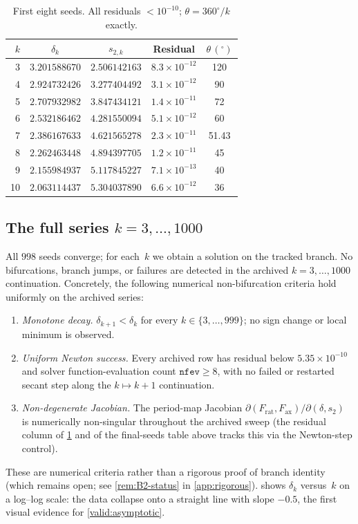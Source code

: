 \documentclass[11pt,a4paper]{article}
\theoremstyle{plain}
\theoremstyle{definition}
\theoremstyle{remark}
\begin{document}
\begin{table}[ht]
\centering
\caption{First eight seeds.  All residuals
  $< 10^{-10}$; $\theta = 360^\circ/k$ exactly.}
\label{tab:first-seeds}
\smallskip
\begin{tabular}{@{}rcccc@{}}
\toprule
$k$ & $\delta_k$ & $s_{2,k}$ & Residual & $\theta\,(^\circ)$ \\
\midrule
3  & $3.201588670$ & $2.506142163$ & $8.3 \times 10^{-12}$ & 120 \\
4  & $2.924732426$ & $3.277404492$ & $3.1 \times 10^{-12}$ & 90 \\
5  & $2.707932982$ & $3.847434121$ & $1.4 \times 10^{-11}$ & 72 \\
6  & $2.532186462$ & $4.281550094$ & $5.1 \times 10^{-12}$ & 60 \\
7  & $2.386167633$ & $4.621565278$ & $2.3 \times 10^{-11}$ & 51.43 \\
8  & $2.262463448$ & $4.894397705$ & $1.2 \times 10^{-11}$ & 45 \\
9  & $2.155984937$ & $5.117845227$ & $7.1 \times 10^{-13}$ & 40 \\
10 & $2.063114437$ & $5.304037890$ & $6.6 \times 10^{-12}$ & 36 \\
\bottomrule
\end{tabular}
\end{table}

\subsection{The full series \texorpdfstring{$k = 3,\ldots,1000$}{k = 3,...,1000}}
\label{sec:full-series}
All $998$ seeds converge; for each~$k$ we obtain a
solution on the tracked branch.
No bifurcations, branch jumps, or
failures are detected in the archived $k = 3,\ldots,1000$
continuation.  Concretely, the following numerical non-bifurcation
criteria hold uniformly on the archived series:
\begin{enumerate}[label=\upshape(\roman*),nosep]
\item \emph{Monotone decay.}  $\delta_{k+1} < \delta_k$ for every
  $k\in\{3,\ldots,999\}$; no sign change or local minimum is observed.
\item \emph{Uniform Newton success.}  Every archived row has residual
  below $5.35\times 10^{-10}$ and solver function-evaluation count
  $\texttt{nfev}\ge 8$, with no failed or restarted secant step along
  the $k\mapsto k+1$ continuation.
\item \emph{Non-degenerate Jacobian.}  The period-map Jacobian
  $\partial(F_{\mathrm{rat}},F_{\mathrm{ax}})/\partial(\delta,s_2)$ is
  numerically non-singular throughout the archived sweep (the residual
  column of \cref{tab:first-seeds} and of the final-seeds table above
  tracks this via the Newton-step control).
\end{enumerate}
These are numerical criteria rather than a rigorous proof of
branch identity (which remains open; see
\cref{rem:B2-status} in \cref{app:rigorous}).
 shows $\delta_k$ versus~$k$
on a log--log scale: the data collapse onto a straight line with
slope $-0.5$, the first visual evidence for \cref{valid:asymptotic}.
\end{document}
